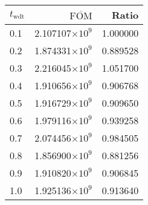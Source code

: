 \begin{tabular}{lrr}
\toprule
$t_{\mathrm{wdt}}$ & $\overline{\mathrm{FOM}}$ &    Ratio \\
\midrule
               0.1 &   2.107107$\times 10^{9}$ & 1.000000 \\
               0.2 &   1.874331$\times 10^{9}$ & 0.889528 \\
               0.3 &   2.216045$\times 10^{9}$ & 1.051700 \\
               0.4 &   1.910656$\times 10^{9}$ & 0.906768 \\
               0.5 &   1.916729$\times 10^{9}$ & 0.909650 \\
               0.6 &   1.979116$\times 10^{9}$ & 0.939258 \\
               0.7 &   2.074456$\times 10^{9}$ & 0.984505 \\
               0.8 &   1.856900$\times 10^{9}$ & 0.881256 \\
               0.9 &   1.910820$\times 10^{9}$ & 0.906845 \\
               1.0 &   1.925136$\times 10^{9}$ & 0.913640 \\
\bottomrule
\end{tabular}
